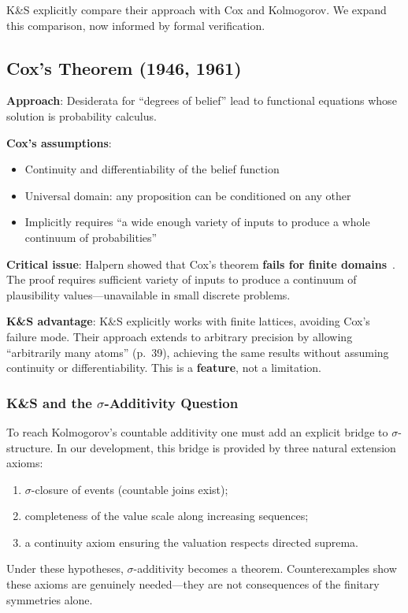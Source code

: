 \documentclass[11pt]{article}
\begin{document}
K\&S explicitly compare their approach with Cox and Kolmogorov. We expand this
comparison, now informed by formal verification.

\subsection{Cox's Theorem (1946, 1961)}

\textbf{Approach}: Desiderata for ``degrees of belief'' lead to functional equations
whose solution is probability calculus.

\textbf{Cox's assumptions}:
\begin{itemize}[noitemsep]
\item Continuity and differentiability of the belief function
\item Universal domain: any proposition can be conditioned on any other
\item Implicitly requires ``a wide enough variety of inputs to produce a whole continuum
      of probabilities''
\end{itemize}

\textbf{Critical issue}: Halpern showed that Cox's theorem \textbf{fails for finite
domains}~\cite{halpern1999}. The proof requires sufficient variety of inputs to
produce a continuum of plausibility values---unavailable in small discrete problems.

\textbf{K\&S advantage}: K\&S explicitly works with finite lattices, avoiding Cox's
failure mode. Their approach extends to arbitrary precision by allowing ``arbitrarily
many atoms'' (p.~39), achieving the same results without assuming continuity or
differentiability. This is a \textbf{feature}, not a limitation.

\subsubsection{K\&S and the \texorpdfstring{$\sigma$}{sigma}-Additivity Question}
\label{sec:sigma-additivity}

To reach Kolmogorov's countable additivity one must add an explicit bridge to $\sigma$-structure.
In our development, this bridge is provided by three natural extension axioms:
\begin{enumerate}[noitemsep]
\item $\sigma$-closure of events (countable joins exist);
\item completeness of the value scale along increasing sequences;
\item a continuity axiom ensuring the valuation respects directed suprema.
\end{enumerate}
Under these hypotheses, $\sigma$-additivity becomes a theorem.
Counterexamples show these axioms are genuinely needed---they are not consequences of the finitary symmetries alone.
\end{document}
